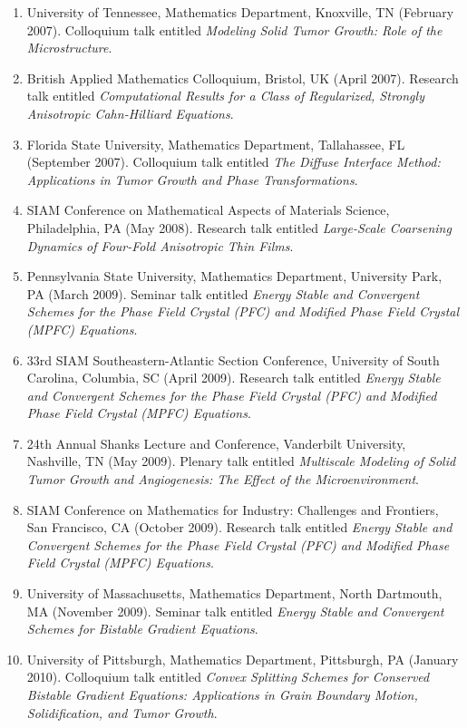 \documentclass[10pt,letterpaper]{article}
\begin{document}
\begin{enumerate}
    \item
University of Tennessee, Mathematics Department, Knoxville, TN (February 2007).  Colloquium talk entitled {\sl Modeling Solid Tumor Growth: Role of the Microstructure}.
    \item
British Applied Mathematics Colloquium, Bristol, UK (April 2007).  Research talk entitled {\sl Computational Results for a Class of Regularized, Strongly Anisotropic Cahn-Hilliard Equations}.
    \item
Florida State University, Mathematics Department, Tallahassee, FL (September 2007).  Colloquium talk entitled {\sl The Diffuse Interface Method: Applications in Tumor Growth and Phase Transformations}.
	\item
SIAM Conference on Mathematical Aspects of Materials Science, Philadelphia, PA (May 2008). Research talk entitled {\sl Large-Scale Coarsening Dynamics of Four-Fold Anisotropic Thin Films}.
    \item
Pennsylvania State University, Mathematics Department, University Park, PA (March 2009).  Seminar talk entitled {\sl Energy Stable and Convergent Schemes for the Phase Field Crystal (PFC) and Modified Phase Field Crystal (MPFC) Equations}.
	\item
33rd SIAM Southeastern-Atlantic Section Conference, University of South Carolina, Columbia, SC (April 2009).  Research talk entitled {\sl Energy Stable and Convergent Schemes for the Phase Field Crystal (PFC) and Modified Phase Field Crystal (MPFC) Equations}.
	\item
24th Annual Shanks Lecture and Conference, Vanderbilt University, Nashville, TN (May 2009). Plenary talk entitled {\sl Multiscale Modeling of Solid Tumor Growth and Angiogenesis: The Effect of the Microenvironment}.
	\item
SIAM Conference on Mathematics for Industry: Challenges and Frontiers, San Francisco, CA (October 2009). Research talk entitled {\sl Energy Stable and Convergent Schemes for the Phase Field Crystal (PFC) and Modified Phase Field Crystal (MPFC) Equations}.
    \item
University of Massachusetts, Mathematics Department, North Dartmouth, MA (November 2009).  Seminar talk entitled {\sl Energy Stable and Convergent Schemes for Bistable Gradient Equations}.
    \item
University of Pittsburgh, Mathematics Department, Pittsburgh, PA (January 2010).  Colloquium talk entitled {\sl Convex Splitting Schemes for Conserved Bistable Gradient Equations: Applications in Grain Boundary Motion, Solidification, and Tumor Growth}.

\end{enumerate}
\end{document}
